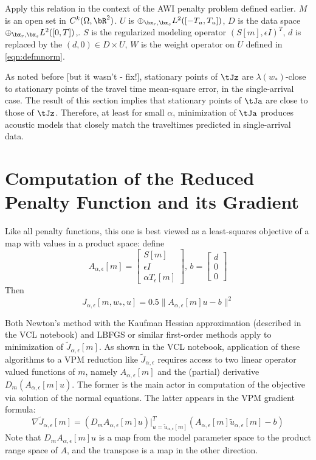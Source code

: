 Apply this relation in the context of the AWI penalty problem defined earlier. $M$ is an open set in $C^k(\Omega, \bR^2)$. $U$ is $\oplus_{\bx_r,\bx_s}L^2([-T_u,T_u])$, $D$ is the data space $\oplus_{\bx_r,\bx_s}L^2([0,T])$,. $S$ is the regularized modeling operator $(S[m],\epsilon I)^T$, $d$ is replaced by the $(d,0) \in D \times U$,  $W$ is the weight operator on $U$ defined in \ref{eqn:defmnorm}.

As noted before [but it wasn't - fix!], stationary points of $\tJz$
are $\lambda(w_*)$-close to stationary points of the travel time
mean-square error, in the single-arrival case. The result of this
section implies that stationary points of $\tJa$ are close to those of
$\tJz$. Therefore, at least for small $\alpha$, minimization of $\tJa$
produces acoustic models that closely match the traveltimes predicted
in single-arrival data.

\section{Computation of the Reduced Penalty Function and its Gradient}
Like all penalty functions, this one is best viewed as a least-squares objective of a map with values in a product space: define
$$
A_{\alpha,\epsilon}[m] =  
\left[
\begin{array}{c}
S[m]\\
\epsilon I\\
\alpha T_{\epsilon}[m]
\end{array}
\right]
, \, b = \left[
\begin{array}{c}
d\\
0\\
0
\end{array}
\right]
$$
Then
$$
J_{\alpha,\epsilon}[m,w_*,u] = 0.5\|A_{\alpha,\epsilon}[m]u-b\|^2
$$

Both Newton's method with the Kaufman Hessian approximation (described in the VCL notebook) and LBFGS or similar first-order methods apply to minimization of $\tilde{J}_{\alpha,\epsilon}[m]$. As shown in the VCL notebook, application of these algorithms to a VPM reduction like $\tilde{J}_{\alpha,\epsilon}$ requires access to two linear operator valued functions of $m$, namely $A_{\alpha,\epsilon}[m]$ and the (partial) derivative $D_m(A_{\alpha,\epsilon}[m]u)$. The former is the main actor in computation of the objective via solution of the normal equations. The latter appears in the VPM gradient formula:
$$
\nabla \tilde{J}_{\alpha,\epsilon}[m] = (D_m A_{\alpha,\epsilon}[m]u)|_{u=\tilde{u}_{\alpha,\epsilon}[m]}^T(A_{\alpha,\epsilon}[m]\tilde{u}_{\alpha,\epsilon}[m] -b)
$$
Note that $D_m A_{\alpha,\epsilon}[m]u$ is a map from the model parameter space to the product range space of $A$, and the transpose is a map in the other direction. 

